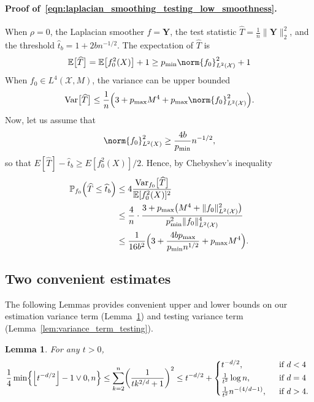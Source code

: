 \documentclass[twoside]{article}
\newcommand{\floor}[1]{\left\lfloor #1 \right\rfloor}
\newcommand{\Var}{\mathrm{Var}}
\newcommand{\1}{\mathbf{1}}
\newcommand{\Xset}{\mathcal{X}}
\newcommand{\Leb}{L}
\newcommand{\Ebb}{\mathbb{E}}
\newcommand{\wh}[1]{\widehat{#1}}
\newtheorem{lemma}{Lemma}
\theoremstyle{definition}
\theoremstyle{remark}
\begin{document}
\paragraph{Proof of~\eqref{eqn:laplacian_smoothing_testing_low_smoothness}.}
When $\rho = 0$, the Laplacian smoother $\wh{f} = \mathbf{Y}$, the test statistic $\wh{T} = \frac{1}{n}\|\mathbf{Y}\|_2^2$, and the threshold $\wh{t}_b = 1 + 2bn^{-1/2}$. The expectation of $\wh{T}$ is 
\begin{equation*}
\Ebb\bigl[\wh{T}\bigr] = \mathbb{E}\bigl[f_0^2(X)\bigr] + 1 \geq p_{\min} \norm{f_0}_{\Leb^2(\Xset)}^2 + 1
\end{equation*}
When $f_0 \in \Leb^4(\Xset,M)$, the variance can be upper bounded
\begin{equation*}
\Var\bigl[\wh{T}\bigr] \leq \frac{1}{n}\Bigl(3 + p_{\max} M^4 + p_{\max}\norm{f_0}_{\Leb^2(\Xset)}^2\Bigr).
\end{equation*}
Now, let us assume that
\begin{equation*}
\norm{f_0}_{\Leb^2(X)}^2 \geq \frac{4b}{p_{\min}} n^{-1/2},
\end{equation*}
so that $E[\wh{T}] - \wh{t}_b \geq E[f_0^2(X)]/2$. Hence, by Chebyshev's inequality
\begin{align*}
\mathbb{P}_{f_0}\Bigl(\wh{T} \leq \wh{t}_b \Bigr) & \leq 4 \frac{\Var_{f_0}\bigl[\wh{T}\bigr]}{\mathbb{E}[f_0^2(X)]^2} \\
& \leq \frac{4}{n} \cdot \frac{ 3 + p_{\max}\bigl(M^4 + \|f_0\|_{\Leb^2(\Xset)}^2 \bigr)}{p_{\min}^2 \|f_0\|_{\Leb^2(\Xset)}^4} \\
& \leq \frac{1}{16b^2}\Bigl(3 + \frac{4bp_{\max}}{p_{\min}n^{1/2}} + p_{\max}M^4\Bigr).
\end{align*}

\subsection{Two convenient estimates}
\label{subsec:convenient_estimate}
The following Lemmas provides convenient upper and lower bounds on our estimation variance term (Lemma~\ref{lem:variance_term_estimation}) and testing variance term (Lemma~\ref{lem:variance_term_testing}).
\begin{lemma}
	\label{lem:variance_term_estimation}
	For any $t > 0$,
	\begin{equation*}
	\frac{1}{4}\min\Bigl\{\floor{t^{-d/2}} - 1 \vee 0,n\Bigr\} \leq \sum_{k = 2}^{n} \biggl(\frac{1}{tk^{2/d} + 1}\biggr)^2 \leq t^{-d/2} +
	\begin{cases*}
	t^{-d/2},& ~~\textrm{if $d < 4$} \\
	\frac{1}{t^2}\log n,& ~~\textrm{if $d = 4$} \\
	\frac{1}{t^2}n^{-(4/d - 1)},&~~\textrm{if $d > 4$.}
	\end{cases*}
	\end{equation*}
\end{lemma}
\end{document}
